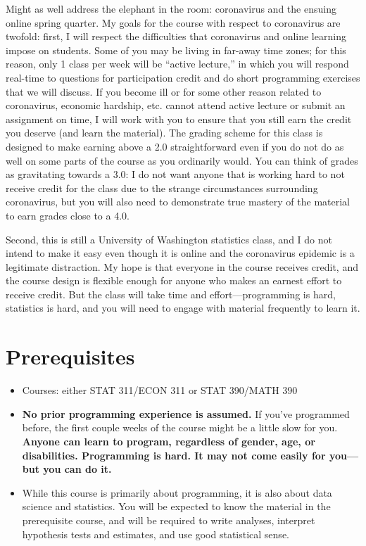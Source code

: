 \documentclass[12pt]{article}
\begin{document}
Might as well address the elephant in the room: coronavirus and the ensuing online spring quarter. My goals for the course with respect to coronavirus are twofold: first, I will respect the difficulties that coronavirus and online learning impose on students. Some of you may be living in far-away time zones; for this reason, only 1 class per week will be ``active lecture,'' in which you will respond real-time to questions for participation credit and do short programming exercises that we will discuss. If you become ill or for some other reason related to coronavirus, economic hardship, etc. cannot attend active lecture or submit an assignment on time, I will work with you to ensure that you still earn the credit you deserve (and learn the material). The grading scheme for this class is designed to make earning above a 2.0 straightforward even if you do not do as well on some parts of the course as you ordinarily would. You can think of grades as gravitating towards a 3.0: I do not want anyone that is working hard to not receive credit for the class due to the strange circumstances surrounding coronavirus, but you will also need to demonstrate true mastery of the material to earn grades close to a 4.0.

Second, this is still a University of Washington statistics class, and I do not intend to make it easy even though it is online and the coronavirus epidemic is a legitimate distraction. My hope is that everyone in the course receives credit, and the course design is flexible enough for anyone who makes an earnest effort to receive credit. But the class will take time and effort---programming is hard, statistics is hard, and you will need to engage with material frequently to learn it.

\section*{Prerequisites}

\begin{itemize}
	\item Courses: either STAT 311/ECON 311 or STAT 390/MATH 390
	\item \textbf{No prior programming experience is assumed.} If you've programmed before, the first couple weeks of the course might be a little slow for you. \textbf{Anyone can learn to program, regardless of gender, age, or disabilities. Programming is hard. It may not come easily for you---but you can do it.}
	\item While this course is primarily about programming, it is also about data science and statistics. You will be expected to know the material in the prerequisite course, and will be required to write analyses, interpret hypothesis tests and estimates, and use good statistical sense.
\end{itemize}
\end{document}
